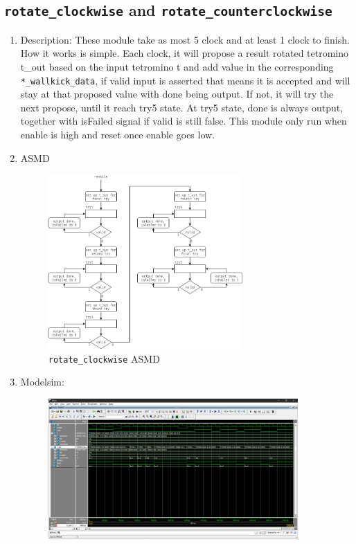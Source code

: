 \documentclass[scale = 0.9]{article}
\newcommand{\code}[1]{\colorbox{light-gray}{\texttt{#1}}} %
\begin{document}
\subsection{\code{rotate\_clockwise} and \code{rotate\_counterclockwise}}
\begin{enumerate}[label=(\alph*)]
  \item Description:
        These module take as most 5 clock and at least 1 clock to finish. How it works is simple. Each
        clock, it will propose a result rotated tetromino t\_out based on  the input tetromino t and
        add value in the corresponding \code{*\_wallkick\_data},
        if valid input is asserted that means it is accepted and will stay at that proposed value with done
        being output. If not, it will try the next propose, until it reach try5 state. At try5 state,
        done is always output, together with isFailed signal if valid is still false. This module
        only run when enable is high and reset once enable goes low.
  \item ASMD
        \begin{figure}[H]
          \begin{center}
            \includegraphics[width=0.7\textwidth]{rotate.png}
            \caption{\code{rotate\_clockwise} ASMD}\label{rotate_ASMD}
          \end{center}
        \end{figure}
  \item Modelsim:
        \begin{figure}[H]
          \begin{center}
            \includegraphics[width=0.9\textwidth]{rotate_clockwise.png}

\end{center}
\end{figure}
\end{enumerate}
\end{document}
